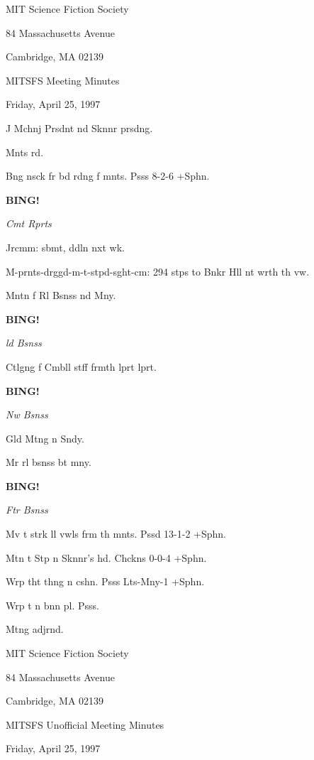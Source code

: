 \documentclass[12pt]{article}
\newcommand{\bing}{{\bf BING!} }
\newcommand{\goto}[1]{\bing \vskip 12pt \centerline{{\em{#1}}}}
\begin{document}
\begin{center}

MIT Science Fiction Society 

84 Massachusetts Avenue

Cambridge, MA 02139

\vspace{12pt}

MITSFS Meeting Minutes 

Friday, April 25, 1997

\end{center}
 
\vspace{18pt}

\setlength{\parskip}{6pt}

\noindent
J Mchnj Prsdnt nd Sknnr prsdng.

Mnts rd.

Bng nsck fr bd rdng f mnts. Psss 8-2-6 +Sphn.

\goto{Cmt Rprts}

Jrcmm: sbmt, ddln nxt wk.

M-prnts-drggd-m-t-stpd-sght-cm: 294 stps to Bnkr Hll nt wrth th vw.

Mntn f Rl Bsnss nd Mny.

\goto{ld Bsnss}

Ctlgng f Cmbll stff frmth lprt lprt.

\goto{Nw Bsnss}

Gld Mtng n Sndy.

Mr rl bsnss bt mny.

\goto{Ftr Bsnss}

Mv t strk ll vwls frm th mnts. Pssd 13-1-2 +Sphn.

Mtn t Stp n Sknnr's hd. Chckns 0-0-4 +Sphn.

Wrp tht thng n cshn. Psss Lts-Mny-1 +Sphn.

Wrp t n bnn pl. Psss.

\vspace{12pt}

\noindent

Mtng adjrnd.

\begin{center}

MIT Science Fiction Society 

84 Massachusetts Avenue

Cambridge, MA 02139

\vspace{12pt}

MITSFS Unofficial Meeting Minutes 

Friday, April 25, 1997

\end{center}
 
\end{document}
